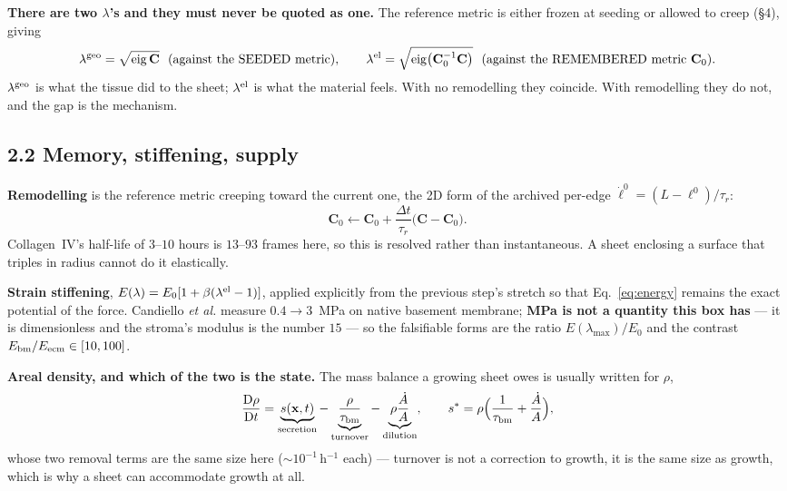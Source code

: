 \documentclass[10pt,a4paper]{article}
\begin{document}
\textbf{There are two $\lambda$'s and they must never be quoted as one.} The reference metric is either
frozen at seeding or allowed to creep (\S4), giving
%
\begin{equation}
\lambda^{\rm geo}=\sqrt{\operatorname{eig}\mathbf C}\ \ \text{(against the SEEDED metric)},
\qquad
\lambda^{\rm el}=\sqrt{\operatorname{eig}\bigl(\mathbf C_0^{-1}\mathbf C\bigr)}\ \
\text{(against the REMEMBERED metric $\mathbf C_0$)} .
\label{eq:twolambda}
\end{equation}
%
$\lambda^{\rm geo}$ is what the tissue did to the sheet; $\lambda^{\rm el}$ is what the material feels.
With no remodelling they coincide. With remodelling they do not, and the gap is the mechanism.

\subsection*{2.2\; Memory, stiffening, supply}


\textbf{Remodelling} is the reference metric creeping toward the current one, the 2D form of the
archived per-edge $\dot\ell^0=(L-\ell^0)/\tau_r$:
%
\begin{equation}
\mathbf C_0\leftarrow\mathbf C_0+\frac{\Delta t}{\tau_r}\bigl(\mathbf C-\mathbf C_0\bigr).
\label{eq:remodel}
\end{equation}
%
Collagen~IV's half-life of $3$--$10$ hours is $13$--$93$ frames here, so this is resolved rather than
instantaneous. A sheet enclosing a surface that triples in radius cannot do it elastically.

\textbf{Strain stiffening}, $E(\lambda)=E_0[1+\beta(\lambda^{\rm el}-1)]$, applied explicitly from the
previous step's stretch so that Eq.~\eqref{eq:energy} remains the exact potential of the force.
Candiello \emph{et al.} measure $0.4\to3$~MPa on native basement membrane; \textbf{MPa is not a quantity
this box has} --- it is dimensionless and the stroma's modulus is the number $15$ --- so the falsifiable
forms are the ratio $E(\lambda_{\max})/E_0$ and the contrast $E_{\rm bm}/E_{\rm ecm}\in[10,100]$.

\textbf{Areal density, and which of the two is the state.} The mass balance a growing sheet owes is
usually written for $\rho$,
%
\begin{equation}
\frac{\mathrm D\rho}{\mathrm Dt}=\underbrace{s(\mathbf x,t)}_{\text{secretion}}
-\underbrace{\frac{\rho}{\tau_{\rm bm}}}_{\text{turnover}}
-\underbrace{\rho\frac{\dot A}{A}}_{\text{dilution}},\qquad
s^\ast=\rho\Bigl(\frac1{\tau_{\rm bm}}+\frac{\dot A}{A}\Bigr),
\label{eq:mass}
\end{equation}
%
whose two removal terms are the same size here ($\sim\!10^{-1}\,$h$^{-1}$ each) --- turnover is not a
correction to growth, it is the same size as growth, which is why a sheet can accommodate growth at all.
\end{document}

